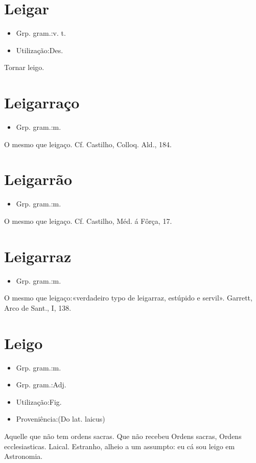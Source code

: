 \section{Leigar}
\begin{itemize}
\item {Grp. gram.:v. t.}
\end{itemize}
\begin{itemize}
\item {Utilização:Des.}
\end{itemize}
Tornar leigo.
\section{Leigarraço}
\begin{itemize}
\item {Grp. gram.:m.}
\end{itemize}
O mesmo que \textunderscore leigaço\textunderscore . Cf. Castilho, \textunderscore Colloq. Ald.\textunderscore , 184.
\section{Leigarrão}
\begin{itemize}
\item {Grp. gram.:m.}
\end{itemize}
O mesmo que \textunderscore leigaço\textunderscore . Cf. Castilho, \textunderscore Méd. á Fôrça\textunderscore , 17.
\section{Leigarraz}
\begin{itemize}
\item {Grp. gram.:m.}
\end{itemize}
O mesmo que \textunderscore leigaço\textunderscore :«\textunderscore verdadeiro typo de leigarraz, estúpido e servil\textunderscore ». Garrett, \textunderscore Arco de Sant.\textunderscore , I, 138.
\section{Leigo}
\begin{itemize}
\item {Grp. gram.:m.}
\end{itemize}
\begin{itemize}
\item {Grp. gram.:Adj.}
\end{itemize}
\begin{itemize}
\item {Utilização:Fig.}
\end{itemize}
\begin{itemize}
\item {Proveniência:(Do lat. \textunderscore laicus\textunderscore )}
\end{itemize}
Aquelle que não tem ordens sacras.
Que não recebeu Ordens sacras, Ordens ecclesiasticas.
Laical.
Estranho, alheio a um assumpto: \textunderscore eu cá sou leigo em Astronomia\textunderscore .
